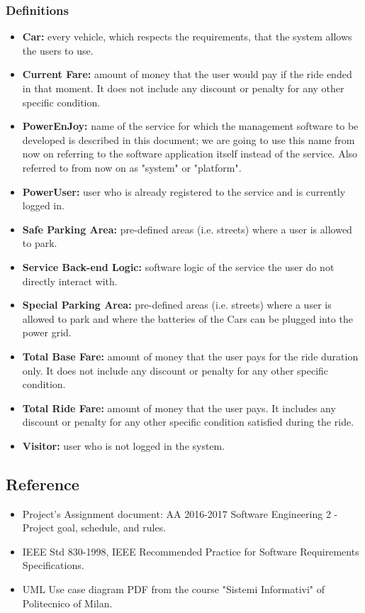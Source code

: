 \subsubsection{Definitions}
\begin{itemize}
\item \textbf{Car:} every vehicle, which respects the requirements, that the system allows the users to use.
\item \textbf{Current Fare:} amount of money that the user would pay if the ride ended in that moment. It does not include any discount or penalty for any other specific condition.
\item \textbf{PowerEnJoy:} name of the service for which the management software to be developed is described in this document; we are going to use this name from now on referring to the software application itself instead of the service. Also referred to from now on as "system" or "platform".
\item \textbf{PowerUser:} user who is already registered to the service and is currently logged in.
\item \textbf{Safe Parking Area:} pre-defined areas (i.e. streets) where a user is allowed to park.
\item \textbf{Service Back-end Logic:} software logic of the service the user do not directly interact with. 
\item \textbf{Special Parking Area:}  pre-defined areas (i.e. streets) where a user is allowed to park and where the batteries of the Cars can be plugged into the power grid.
\item \textbf{Total Base Fare:} amount of money that the user pays for the ride duration only. It does not include any discount or penalty for any other specific condition.
\item \textbf{Total Ride Fare:} amount of money that the user pays. It includes any discount or penalty for any other specific condition satisfied during the ride.
\item \textbf{Visitor:} user who is not logged in the system.
\end{itemize}
\subsection{Reference}
\begin{itemize}
\item Project's Assignment document: AA 2016-2017 Software Engineering 2 - Project goal, schedule, and rules.
\item IEEE Std 830-1998, IEEE Recommended Practice for Software Requirements Specifications.
\item UML Use case diagram PDF from the course "Sistemi Informativi" of Politecnico of Milan.
\end{itemize}
